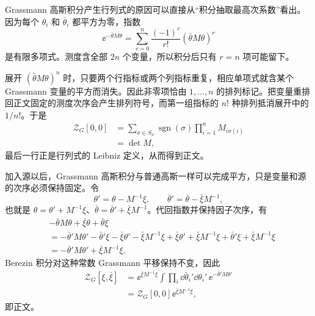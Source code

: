 










\begin{derivation}
Grassmann 高斯积分产生行列式的原因可以直接从“积分抽取最高次系数”看出。因为每个 $\theta_i$ 和 $\bar\theta_i$ 都平方为零，指数
\begin{equation*}
 \ee^{-\bar\theta M\theta}
 =\sum_{r=0}^{n}\frac{(-1)^r}{r!}(\bar\theta M\theta)^r
\end{equation*}
是有限多项式。测度含全部 $2n$ 个变量，所以积分后只有 $r=n$ 项可能留下。

展开 $(\bar\theta M\theta)^n$ 时，只要两个行指标或两个列指标重复，相应单项式就含某个 Grassmann 变量的平方而消失。因此非零项恰由 $1,\ldots,n$ 的排列标记。把变量重排回正文固定的测度次序会产生排列符号，而第一组指标的 $n!$ 种排列抵消展开中的 $1/n!$。于是
\begin{align*}
 \mathcal Z_G[0,0]
 &=\sum_{\sigma\in S_n}\operatorname{sgn}(\sigma)
 \prod_{i=1}^{n}M_{i\sigma(i)}\\
 &=\det M,
\end{align*}
最后一行正是行列式的 Leibniz 定义，从而得到正文。
\end{derivation}

\begin{derivation}
加入源以后，Grassmann 高斯积分与普通高斯一样可以完成平方，只是变量和源的次序必须保持固定。令
\begin{equation*}
 \theta'=\theta-M^{-1}\xi,
 \qquad
 \bar\theta'=\bar\theta-\bar\xi M^{-1},
\end{equation*}
也就是 $\theta=\theta'+M^{-1}\xi$、$\bar\theta=\bar\theta'+\bar\xi M^{-1}$。代回指数并保持因子次序，有
\begin{align*}
 &-\bar\theta M\theta+\bar\xi\theta+\bar\theta\xi\\
 &=-\bar\theta'M\theta'
 -\bar\theta'\xi-\bar\xi\theta'-\bar\xi M^{-1}\xi
 +\bar\xi\theta'+\bar\xi M^{-1}\xi
 +\bar\theta'\xi+\bar\xi M^{-1}\xi\\
 &=-\bar\theta'M\theta'+\bar\xi M^{-1}\xi.
\end{align*}
Berezin 积分对这种常数 Grassmann 平移保持不变，因此
\begin{align*}
 \mathcal Z_G[\xi,\bar\xi]
 &=\ee^{\bar\xi M^{-1}\xi}
 \int\prod_i\dd\bar\theta_i'\dd\theta_i'\,
 \ee^{-\bar\theta'M\theta'}\\
 &=\mathcal Z_G[0,0]\ee^{\bar\xi M^{-1}\xi},
\end{align*}
即正文。
\end{derivation}

